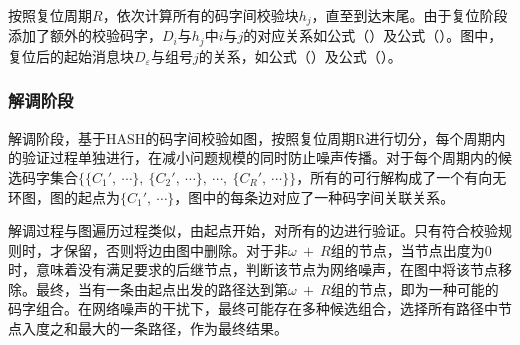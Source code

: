 按照复位周期$R$，依次计算所有的码字间校验块$h_{j}$，直至到达末尾。由于复位阶段添加了额外的校验码字，$D_{i}$与$h_{j}$中$i$与$j$的对应关系如公式（）及公式（）。图中，复位后的起始消息块$D_{\varepsilon}$与组号$j$的关系，如公式（）及公式（）。

\subsubsection{解调阶段}
\label{chap:hash:robustness:hash:demodulation}


解调阶段，基于HASH的码字间校验如图，按照复位周期R进行切分，每个周期内的验证过程单独进行，在减小问题规模的同时防止噪声传播。对于每个周期内的候选码字集合$\{\{C_{1}',\ \cdots\},\ \{C_{2}',\ \cdots \},\ \cdots ,\ \{C_{R}',\ \cdots\}\}$，所有的可行解构成了一个有向无环图，图的起点为$\{C_{1}',\ \cdots \}$，图中的每条边对应了一种码字间关联关系。

解调过程与图遍历过程类似，由起点开始，对所有的边进行验证。只有符合校验规则时，才保留，否则将边由图中删除。对于非$\omega\ +\ R$组的节点，当节点出度为0时，意味着没有满足要求的后继节点，判断该节点为网络噪声，在图中将该节点移除。最终，当有一条由起点出发的路径达到第$\omega\ +\ R$组的节点，即为一种可能的码字组合。在网络噪声的干扰下，最终可能存在多种候选组合，选择所有路径中节点入度之和最大的一条路径，作为最终结果。

